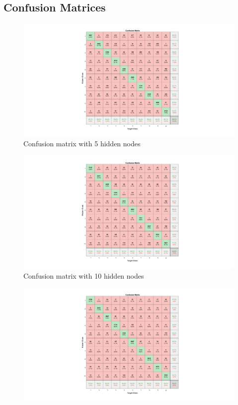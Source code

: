 \documentclass{article}
\begin{document}
{    \subsection*{Confusion Matrices}
    {
        \begin{figure}[H]
            \centering
            \includegraphics[width = 1.0\linewidth]{src1/Confusion_5.png}
            \caption{Confusion matrix with 5 hidden nodes}
        \end{figure}
        \begin{figure}[H]
            \centering
            \includegraphics[width = 1.0\linewidth]{src1/Confusion_10.png}
            \caption{Confusion matrix with 10 hidden nodes}
        \end{figure}
        \begin{figure}[H]
            \centering
            \includegraphics[width = 1.0\linewidth]{src1/Confusion_20.png}

\end{figure}}}
\end{document}
